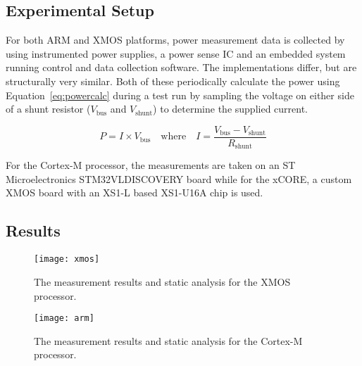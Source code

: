 \documentclass[9pt,preprint]{sigplanconf}
\begin{document}
\subsection{Experimental Setup}
For both ARM and XMOS platforms, power measurement data is collected by using
instrumented power supplies, a power sense IC and an embedded
system running control and data collection software. The implementations
differ, but are structurally very similar. Both of these periodically calculate the
power using Equation~\ref{eq:powercalc} during a test run by sampling the
voltage on either side of a shunt resistor ($V_\text{bus}$ and $V_\text{shunt}$)
to determine the supplied current.

\begin{equation}
P = I \times V_\text{bus} \quad \text{where} \quad
I = \frac{V_\text{bus} - V_\text{shunt}}{R_\text{shunt}}
\label{eq:powercalc}
\end{equation}

For the Cortex-M processor, the measurements are taken on an ST Microelectronics
STM32VLDISCOVERY board while for the xCORE, a custom XMOS board with an
XS1-L based XS1-U16A chip is used.

\subsection{Results}

\begin{figure}
  \centering
  \texttt{[image: xmos]}
  \caption{The measurement results and static analysis for the XMOS processor.}
  \label{fig:xmos_results}
\end{figure}
\begin{figure}
  \centering
  \texttt{[image: arm]}
  \caption{The measurement results and static analysis for the Cortex-M processor.}
  \label{fig:arm_results}
\end{figure}
\end{document}
